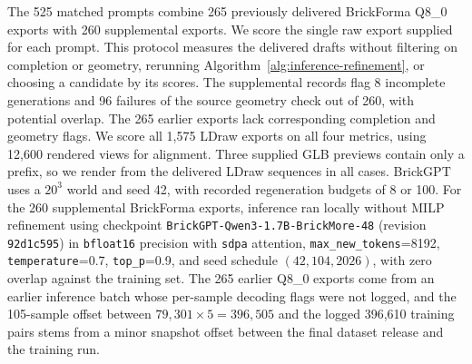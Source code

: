 \documentclass[letterpaper]{article} %
\begin{document}
The 525 matched prompts combine 265 previously delivered BrickForma Q8\_0 exports with 260 supplemental exports. We score the single raw export supplied for each prompt. This protocol measures the delivered drafts without filtering on completion or geometry, rerunning Algorithm~\ref{alg:inference-refinement}, or choosing a candidate by its scores. The supplemental records flag 8 incomplete generations and 96 failures of the source geometry check out of 260, with potential overlap. The 265 earlier exports lack corresponding completion and geometry flags. We score all 1,575 LDraw exports on all four metrics, using 12,600 rendered views for alignment. Three supplied GLB previews contain only a prefix, so we render from the delivered LDraw sequences in all cases. BrickGPT uses a $20^3$ world and seed 42, with recorded regeneration budgets of 8 or 100. For the 260 supplemental BrickForma exports, inference ran locally without MILP refinement using checkpoint \texttt{BrickGPT-Qwen3-1.7B-BrickMore-48} (revision \texttt{92d1c595}) in \texttt{bfloat16} precision with \texttt{sdpa} attention, \texttt{max\_new\_tokens}=8192, \texttt{temperature}=0.7, \texttt{top\_p}=0.9, and seed schedule $(42,104,2026)$, with zero overlap against the training set. The 265 earlier Q8\_0 exports come from an earlier inference batch whose per-sample decoding flags were not logged, and the 105-sample offset between $79{,}301{\times}5=396{,}505$ and the logged 396,610 training pairs stems from a minor snapshot offset between the final dataset release and the training run.
\end{document}
